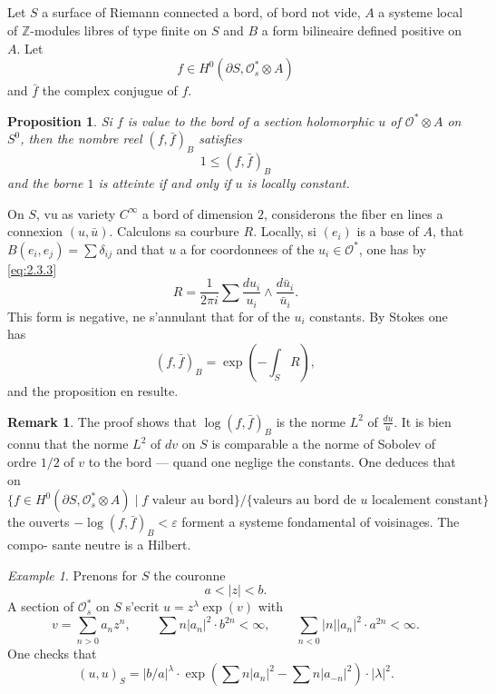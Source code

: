 \documentclass[12pt,a4paper]{article}
\theoremstyle{plain}
\newtheorem{proposition}[theorem]{Proposition}
\theoremstyle{definition}
\newtheorem{remark}[theorem]{Remark}
\theoremstyle{remark}
\newtheorem{example}[theorem]{Example}
\newcommand{\cO}{\mathcal{O}}
\newcommand{\Z}{\mathbb{Z}}
\providecommand{\cO}{\mathcal{O}}
\begin{document}
\subsection{}

Let $S$ a surface of Riemann connected a bord, of bord not vide, $A$ a
systeme local of $\Z$-modules libres of type finite on $S$ and $B$ a form bilineaire defined
positive on $A$. Let
\[
f \in H^0(\partial S, \cO_s^* \otimes A)
\]
and $\bar{f}$ the complex conjugue of $f$.

\begin{proposition}
Si $f$ is value to the bord of a section holomorphic $u$ of $\cO^* \otimes A$ on $S^0$, then
the nombre reel $(f, \bar{f})_B$ satisfies
\[
1 \leq (f, \bar{f})_B
\]
and the borne $1$ is atteinte if and only if $u$ is locally constant.
\end{proposition}

On $S$, vu as variety $C^\infty$ a bord of dimension $2$, considerons the fiber en lines
a connexion $(u, \bar{u})$. Calculons sa courbure $R$. Locally, si $(e_i)$ is a base of $A$, that
$B(e_i, e_j) = \sum \delta_{ij}$ and that $u$ a for coordonnees of the $u_i \in \cO^*$, one has by \eqref{eq:2.3.3}
\[
R = \frac{1}{2\pi i} \sum \frac{du_i}{u_i} \wedge \frac{d\bar{u}_i}{\bar{u}_i}.
\]
This form is negative, ne s'annulant that for of the $u_i$ constants. By Stokes one has
\[
(f, \bar{f})_B = \exp\left(-\int_S R\right),
\]
and the proposition en resulte.

\begin{remark}
The proof shows that $\log(f, \bar{f})_B$ is the norme $L^2$ of $\tfrac{du}{u}$. It
is bien connu that the norme $L^2$ of $dv$ on $S$ is comparable a the norme of Sobolev
of ordre $1/2$ of $v$ to the bord --- quand one neglige the constants. One deduces that on
\[
\{f \in H^0(\partial S, \cO_s^* \otimes A) \mid f \text{ valeur au bord}\}
/\{\text{valeurs au bord de } u \text{ localement constant}\}
\]
the ouverts $-\log(f, \bar{f})_B < \varepsilon$ forment a systeme fondamental of voisinages. The compo-
sante neutre is a Hilbert.
\end{remark}

\begin{example}
Prenons for $S$ the couronne
\[
a < |z| < b.
\]
A section of $\cO_s^*$ on $S$ s'ecrit $u = z^\lambda \exp(v)$ with
\[
v = \sum_{n > 0} a_n z^n, \qquad \sum n |a_n|^2 \cdot b^{2n} < \infty, \qquad \sum_{n < 0} |n| |a_n|^2 \cdot a^{2n} < \infty.
\]
One checks that
\[
(u, u)_S = |b/a|^\lambda \cdot \exp\left(\sum n |a_n|^2 - \sum n |a_{-n}|^2\right) \cdot |\lambda|^2.
\]
\end{example}
\end{document}
